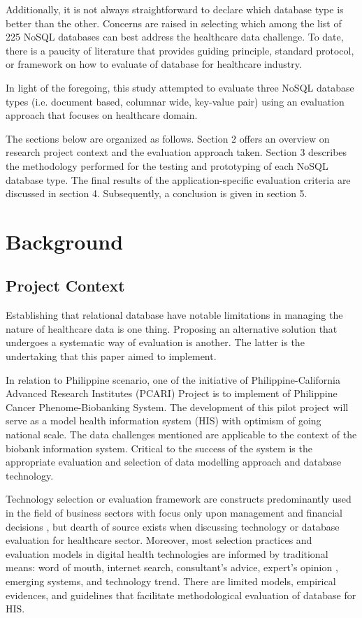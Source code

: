 \documentclass[5p]{elsarticle}
\begin{document}
Additionally, it is not always straightforward to declare which database type is better than the other. Concerns are raised in selecting which among the list of 225 NoSQL databases \cite{S.Edlich2018} 
can best address the healthcare data challenge. To date, there is a paucity of literature that provides guiding principle, standard protocol, or framework on how to
evaluate of database for healthcare industry.

In light of the foregoing, this study attempted to evaluate three NoSQL database types (i.e. document based, columnar wide, key-value pair) using an evaluation approach that focuses on healthcare domain.

The sections below are organized as follows.
Section 2 offers an overview on research project context and the evaluation approach taken. 
Section 3 describes the methodology performed for the testing and prototyping of each NoSQL database type.
The final results of the application-specific evaluation criteria are discussed in section 4. 
Subsequently, a conclusion is given in section 5.

\section{Background}
\subsection{Project Context}
Establishing that relational database have notable limitations in managing the nature of healthcare data \cite{Z.Goli-Malekabadi201675,K.Lee201299,H.Al-Fatlawi2015122,O.Schmitt20121,Y.Jin2011288} is one thing. 
Proposing an alternative solution that undergoes a systematic way of evaluation is another. The latter is the undertaking that this paper aimed to implement.

In relation to Philippine scenario, one of the initiative of Philippine-California Advanced Research Institutes (PCARI) Project is to implement 
of Philippine Cancer Phenome-Biobanking System. The development of this pilot project will serve as a model health information system (HIS) with optimism 
of going national scale. The data challenges mentioned are applicable to the context of the biobank information system. 
Critical to the success of the system is the appropriate evaluation and selection of data modelling approach and database technology.


Technology selection or evaluation framework are constructs predominantly used in the field of business sectors with focus only upon management and financial 
decisions \cite{C.Chan2010300}, but dearth of source exists when discussing technology or database evaluation for healthcare sector. Moreover, most selection 
practices and evaluation models in digital health technologies are informed by traditional means: word of mouth, internet search, consultant’s advice, expert’s opinion \cite{A.Ostrovsky20141}, 
emerging systems, and technology trend. There are limited models, empirical evidences, and guidelines that facilitate methodological evaluation of database for HIS. 
\end{document}
